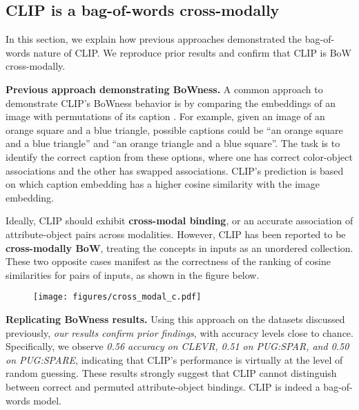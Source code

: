 \subsection{CLIP is a bag-of-words cross-modally}
\label{sec:status_quo}
In this section, we explain how previous approaches demonstrated the bag-of-words nature of CLIP. We reproduce prior results and confirm that CLIP is BoW cross-modally.

\noindent
\textbf{Previous approach demonstrating BoWness.}
A common approach to demonstrate CLIP’s BoWness behavior is by comparing the embeddings of an image with permutations of its caption \cite{Yuksekgonul2023}. For example, given an image of an orange square and a blue triangle, possible captions could be ``an orange square and a blue triangle'' and ``an orange triangle and a blue square''. The task is to identify the correct caption from these options, where one has correct color-object associations and the other has swapped associations. CLIP’s prediction is based on which caption embedding has a higher cosine similarity with the image embedding.


Ideally, CLIP should exhibit \textbf{cross-modal binding}, or an accurate association of attribute-object pairs across modalities. However, CLIP has been reported to be \textbf{cross-modally BoW}, treating the concepts in inputs as an unordered collection. These two opposite cases manifest as the correctness of the ranking of cosine similarities for pairs of inputs, as shown in the figure below. 

\begin{figure}[h!]
  \centering
  \vspace{-1em}
   \texttt{[image: figures/cross\_modal\_c.pdf]}
   \vspace{-2em}
\end{figure}

\noindent
\textbf{Replicating BoWness results.}   Using this approach on the datasets discussed previously, \textit{our results confirm prior findings}, with accuracy levels close to chance. Specifically, we observe \textit{0.56 accuracy on CLEVR, 0.51 on PUG:SPAR, and 0.50 on PUG:SPARE}, indicating that CLIP’s performance is virtually at the level of random guessing. These results strongly suggest that CLIP cannot distinguish between correct and permuted attribute-object bindings. CLIP is indeed a bag-of-words model.









